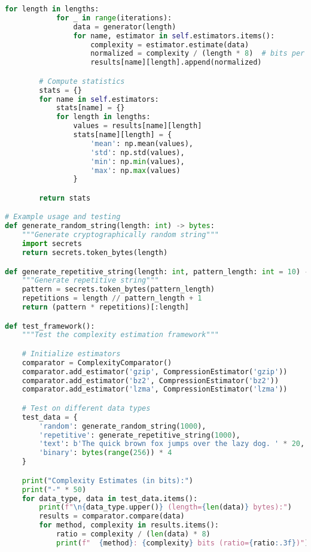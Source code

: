 \documentclass[12pt,a4paper]{report}
\begin{document}
\begin{lstlisting}[language=Python, caption=Complexity Estimation Framework]
        for length in lengths:
            for _ in range(iterations):
                data = generator(length)
                for name, estimator in self.estimators.items():
                    complexity = estimator.estimate(data)
                    normalized = complexity / (length * 8)  # bits per byte
                    results[name][length].append(normalized)

        # Compute statistics
        stats = {}
        for name in self.estimators:
            stats[name] = {}
            for length in lengths:
                values = results[name][length]
                stats[name][length] = {
                    'mean': np.mean(values),
                    'std': np.std(values),
                    'min': np.min(values),
                    'max': np.max(values)
                }

        return stats

# Example usage and testing
def generate_random_string(length: int) -> bytes:
    """Generate cryptographically random string"""
    import secrets
    return secrets.token_bytes(length)

def generate_repetitive_string(length: int, pattern_length: int = 10) -> bytes:
    """Generate repetitive string"""
    pattern = secrets.token_bytes(pattern_length)
    repetitions = length // pattern_length + 1
    return (pattern * repetitions)[:length]

def test_framework():
    """Test the complexity estimation framework"""

    # Initialize estimators
    comparator = ComplexityComparator()
    comparator.add_estimator('gzip', CompressionEstimator('gzip'))
    comparator.add_estimator('bz2', CompressionEstimator('bz2'))
    comparator.add_estimator('lzma', CompressionEstimator('lzma'))

    # Test on different data types
    test_data = {
        'random': generate_random_string(1000),
        'repetitive': generate_repetitive_string(1000),
        'text': b'The quick brown fox jumps over the lazy dog. ' * 20,
        'binary': bytes(range(256)) * 4
    }

    print("Complexity Estimates (in bits):")
    print("-" * 50)
    for data_type, data in test_data.items():
        print(f"\n{data_type.upper()} (length={len(data)} bytes):")
        results = comparator.compare(data)
        for method, complexity in results.items():
            ratio = complexity / (len(data) * 8)
            print(f"  {method}: {complexity} bits (ratio={ratio:.3f})")


\end{lstlisting}
\end{document}
